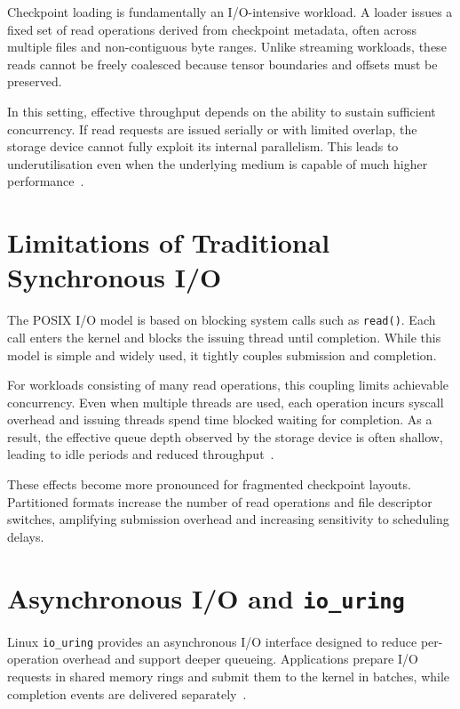 \documentclass[]{final_report}
\begin{document}
Checkpoint loading is fundamentally an I/O-intensive workload. A loader issues a fixed set of read operations derived from checkpoint metadata, often across multiple files and non-contiguous byte ranges. Unlike streaming workloads, these reads cannot be freely coalesced because tensor boundaries and offsets must be preserved.

In this setting, effective throughput depends on the ability to sustain sufficient concurrency. If read requests are issued serially or with limited overlap, the storage device cannot fully exploit its internal parallelism. This leads to underutilisation even when the underlying medium is capable of much higher performance~\cite{NVME_SPEC,STORAGE_QUEUEING}.

\section{Limitations of Traditional Synchronous I/O}

The POSIX I/O model is based on blocking system calls such as \texttt{read()}. Each call enters the kernel and blocks the issuing thread until completion. While this model is simple and widely used, it tightly couples submission and completion.

For workloads consisting of many read operations, this coupling limits achievable concurrency. Even when multiple threads are used, each operation incurs syscall overhead and issuing threads spend time blocked waiting for completion. As a result, the effective queue depth observed by the storage device is often shallow, leading to idle periods and reduced throughput~\cite{LINUX_KERNEL_DEVELOPMENT,LINUX_BLOCK_LAYER}.

These effects become more pronounced for fragmented checkpoint layouts. Partitioned formats increase the number of read operations and file descriptor switches, amplifying submission overhead and increasing sensitivity to scheduling delays.

\section{Asynchronous I/O and \texttt{io\_uring}}

Linux \texttt{io\_uring} provides an asynchronous I/O interface designed to reduce per-operation overhead and support deeper queueing. Applications prepare I/O requests in shared memory rings and submit them to the kernel in batches, while completion events are delivered separately~\cite{AXBOE_IOURING_PDF,MAN7_IOURING7}.
\end{document}
